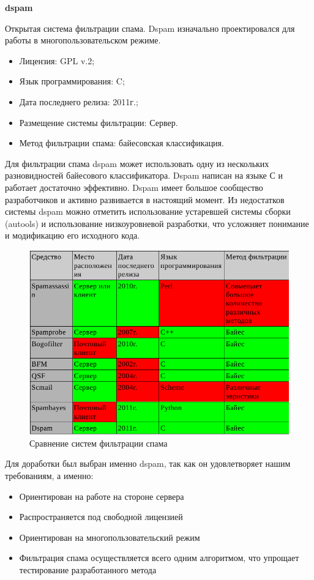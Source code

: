 \textbf{dspam} 

Открытая система фильтрации спама. Dspam изначально проектировался для работы в многопользовательском режиме.
\begin{itemize}
\item Лицензия: GPL v.2;
\item Язык программирования: C;
\item Дата последнего релиза: 2011г.;
\item Размещение системы фильтрации: Сервер.
\item Метод фильтрации спама: байесовская классификация.
\end{itemize}

Для фильтрации спама dspam может использовать одну из нескольких разновидностей байесового классификатора.
Dspam написан на языке С и работает достаточно эффективно. Dspam имеет большое сообщество разработчиков и активно развивается в настоящий момент.
Из недостатков системы dspam можно отметить использование устаревшей системы сборки (autools) и использование низкоуровневой разработки, что усложняет понимание и модификацию его исходного кода.
\begin{figure}[h]
\begin{center}
\includegraphics[width=13cm]{img/compare}
\end{center}
\caption{Сравнение систем фильтрации спама}
\label{spam_systems}
\end{figure}


Для доработки был выбран именно dspam, так как он удовлетворяет нашим требованиям, а именно:
\begin{itemize}
\item Ориентирован на работе на стороне сервера
\item Распространяется под свободной лицензией
\item Ориентирован на многопользовательский режим
\item Фильтрация спама осуществляется  всего одним алгоритмом, что упрощает тестирование разработанного метода
\end{itemize}


